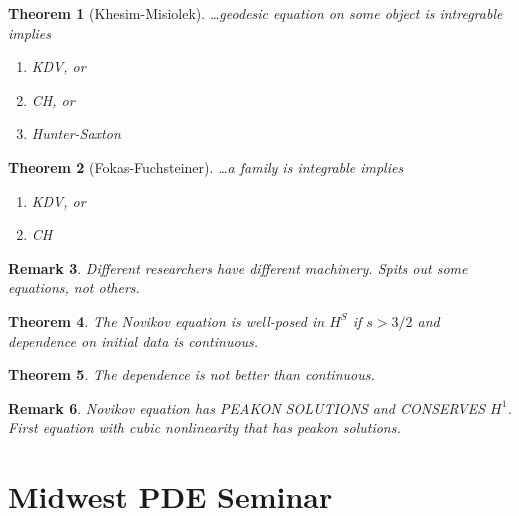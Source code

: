 \documentclass[12pt,reqno]{amsart}
\numberwithin{equation}{section}  %
\newtheorem{theorem}{Theorem}[section]
\newtheorem{remark}[theorem]{Remark}
\begin{document}
%
%
%                
%
%
%
%
\begin{theorem}[Khesim-Misiolek]
\ldots geodesic equation on some object is intregrable implies
\begin{enumerate}
 \item{KDV, or}
 \item{CH, or}
 \item{Hunter-Saxton}
\end{enumerate}
%
\end{theorem}
%
%
%
%
%
%
%                
%
%
%
%
\begin{theorem}[Fokas-Fuchsteiner]
\ldots a family is integrable implies
\begin{enumerate}
\item{KDV, or}
\item{CH}
  \end{enumerate}
\end{theorem}
%
%
%
%
\begin{framed}
\begin{remark}
Different researchers have different machinery. Spits out some equations, not
others.
\end{remark}
\end{framed}
%
%
%
%
%
%
%                
%
%
%
%
\begin{theorem}
  The Novikov equation is well-posed in $H^{S}$ if $s > 3/2$ and dependence on
  initial data is continuous.
\end{theorem}
%
%
%
%
%
%
%                
%
%
%
%
\begin{theorem}
The dependence is not better than continuous.
\end{theorem}
%
%
%
%
\begin{framed}
%
%
\begin{remark}
  Novikov equation has PEAKON SOLUTIONS and CONSERVES $H^{1}$. First equation
  with cubic nonlinearity that has peakon solutions. 
\end{remark}
%
%
\end{framed}
%
%
%
%
%
%
%
%
%
%
\section{Midwest PDE Seminar} 
\label{sec:mpde}
\end{document}
